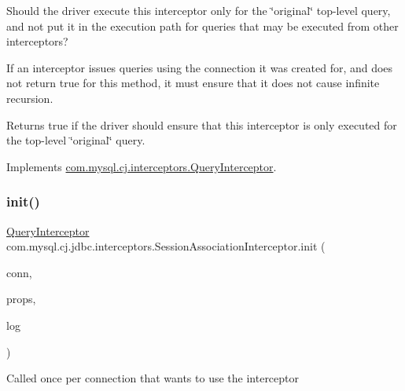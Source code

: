 Should the driver execute this interceptor only for the \char`\"{}original\char`\"{} top-\/level query, and not put it in the execution path for queries that may be executed from other interceptors?

If an interceptor issues queries using the connection it was created for, and does not return {\ttfamily true} for this method, it must ensure that it does not cause infinite recursion.

\begin{DoxyReturn}{Returns}
true if the driver should ensure that this interceptor is only executed for the top-\/level \char`\"{}original\char`\"{} query. 
\end{DoxyReturn}


Implements \mbox{\hyperlink{interfacecom_1_1mysql_1_1cj_1_1interceptors_1_1_query_interceptor_ab12edf90713df907ba400dbe3ba03ea6}{com.\+mysql.\+cj.\+interceptors.\+Query\+Interceptor}}.

\mbox{\label{classcom_1_1mysql_1_1cj_1_1jdbc_1_1interceptors_1_1_session_association_interceptor_af6940dabb40c900b336fb6f5761160b6}} 
\subsubsection{\texorpdfstring{init()}{init()}}
{\footnotesize\ttfamily \mbox{\hyperlink{interfacecom_1_1mysql_1_1cj_1_1interceptors_1_1_query_interceptor}{Query\+Interceptor}} com.\+mysql.\+cj.\+jdbc.\+interceptors.\+Session\+Association\+Interceptor.\+init (\begin{DoxyParamCaption}\item[{\mbox{\hyperlink{interfacecom_1_1mysql_1_1cj_1_1_mysql_connection}{Mysql\+Connection}}}]{conn,  }\item[{Properties}]{props,  }\item[{\mbox{\hyperlink{interfacecom_1_1mysql_1_1cj_1_1log_1_1_log}{Log}}}]{log }\end{DoxyParamCaption})}

Called once per connection that wants to use the interceptor

